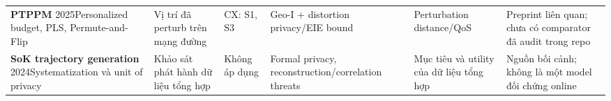 \begin{tabularx}{\linewidth}{@{}P{2.75cm}P{2.15cm}P{1.6cm}P{2.4cm}P{2.5cm}Y@{}}
\textbf{PTPPM} 2025\cite{ptppm}\newline Personalized budget, PLS, Permute-and-Flip & Vị trí đã perturb trên mạng đường & CX: S1, S3 & Geo-I + distortion privacy/EIE bound & Perturbation distance/QoS & Preprint liên quan; chưa có comparator đã audit trong repo \\
\textbf{SoK trajectory generation} 2024\cite{sok}\newline Systematization và unit of privacy & Khảo sát phát hành dữ liệu tổng hợp & Không áp dụng & Formal privacy, reconstruction/correlation threats & Mục tiêu và utility của dữ liệu tổng hợp & Nguồn bối cảnh; không là một model đối chứng online \\
\bottomrule\end{tabularx}\par\smallskip
